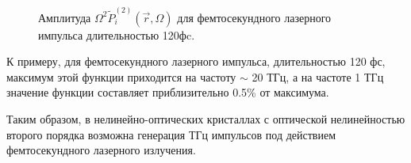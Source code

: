 \documentclass[a4paper,14pt,russian]{extreport}
\begin{document}
				\begin{figure}[]
					\caption{Амплитуда $\Omega^2 \tilde{P}_i^{(2)}(\vec{r},\Omega)$ для фемтосекундного лазерного импульса длительностью 120фc.}
				\label{ris:Fourier1}
				\end{figure}
				К примеру, для фемтосекундного лазерного импульса, длительностью 120 фс, максимум этой функции приходится на частоту $\sim$ 20 ТГц, а на частоте 1 ТГц значение функции составляет приблизительно 0.5\% от максимума.\par
				Таким образом, в нелинейно-оптических кристаллах с оптической нелинейностью второго порядка возможна генерация ТГц импульсов под действием фемтосекундного лазерного излучения.
\end{document}
